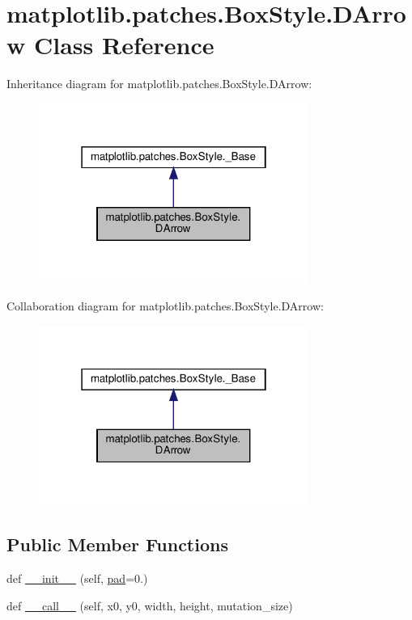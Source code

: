 \hypertarget{classmatplotlib_1_1patches_1_1BoxStyle_1_1DArrow}{}\section{matplotlib.\+patches.\+Box\+Style.\+D\+Arrow Class Reference}
\label{classmatplotlib_1_1patches_1_1BoxStyle_1_1DArrow}


Inheritance diagram for matplotlib.\+patches.\+Box\+Style.\+D\+Arrow\+:
\nopagebreak
\begin{figure}[H]
\begin{center}
\leavevmode
\includegraphics[width=250pt]{classmatplotlib_1_1patches_1_1BoxStyle_1_1DArrow__inherit__graph}
\end{center}
\end{figure}


Collaboration diagram for matplotlib.\+patches.\+Box\+Style.\+D\+Arrow\+:
\nopagebreak
\begin{figure}[H]
\begin{center}
\leavevmode
\includegraphics[width=250pt]{classmatplotlib_1_1patches_1_1BoxStyle_1_1DArrow__coll__graph}
\end{center}
\end{figure}
\subsection*{Public Member Functions}
\begin{DoxyCompactItemize}
\item 
def \hyperlink{classmatplotlib_1_1patches_1_1BoxStyle_1_1DArrow_a29e1d6076f80c3f4deff4a30552057ec}{\+\_\+\+\_\+init\+\_\+\+\_\+} (self, \hyperlink{classmatplotlib_1_1patches_1_1BoxStyle_1_1DArrow_a3e3e34e71c2119467e24d32238673366}{pad}=0.)
\item 
def \hyperlink{classmatplotlib_1_1patches_1_1BoxStyle_1_1DArrow_a45356a9bb394319c8fc2de29fb9b3b06}{\+\_\+\+\_\+call\+\_\+\+\_\+} (self, x0, y0, width, height, mutation\+\_\+size)
\end{DoxyCompactItemize}
